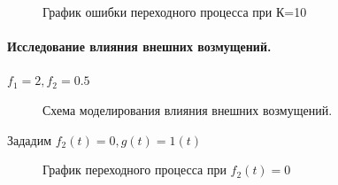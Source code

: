 \documentclass[a4paper, 11pt]{article}
\begin{document}
\begin{figure}[h!]
    \caption{График ошибки переходного процесса при К=10}
    \label{tree}
\end{figure}

\newpage
\paragraph{Исследование влияния внешних возмущений.\\} $f_1=2,  f_2=0.5$

\begin{figure}[h]
    \caption{Схема моделирования влияния внешних возмущений.}
    \label{tree}
\end{figure}

Зададим $f_2(t) = 0, g(t) = 1(t)$

\begin{figure}[h!]
    \caption{График переходного процесса при $f_2(t) = 0$}
    \label{two}
\end{figure}
\end{document}
